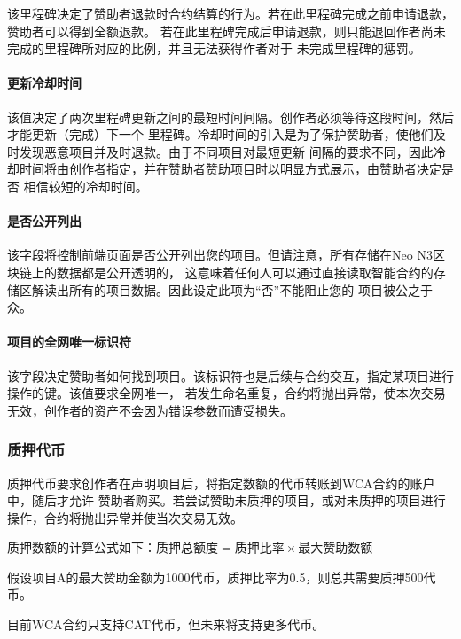 \documentclass[11pt,UTF8,a4paper]{ctexart}
\begin{document}
    该里程碑决定了赞助者退款时合约结算的行为。若在此里程碑完成之前申请退款，赞助者可以得到全额退款。
    若在此里程碑完成后申请退款，则只能退回作者尚未完成的里程碑所对应的比例，并且无法获得作者对于
    未完成里程碑的惩罚。

    \paragraph{更新冷却时间}

    该值决定了两次里程碑更新之间的最短时间间隔。创作者必须等待这段时间，然后才能更新（完成）下一个
    里程碑。冷却时间的引入是为了保护赞助者，使他们及时发现恶意项目并及时退款。由于不同项目对最短更新
    间隔的要求不同，因此冷却时间将由创作者指定，并在赞助者赞助项目时以明显方式展示，由赞助者决定是否
    相信较短的冷却时间。

    \paragraph{是否公开列出}

    该字段将控制前端页面是否公开列出您的项目。但请注意，所有存储在Neo N3区块链上的数据都是公开透明的，
    这意味着任何人可以通过直接读取智能合约的存储区解读出所有的项目数据。因此设定此项为“否”不能阻止您的
    项目被公之于众。

    \paragraph{项目的全网唯一标识符}

    该字段决定赞助者如何找到项目。该标识符也是后续与合约交互，指定某项目进行操作的键。该值要求全网唯一，
    若发生命名重复，合约将抛出异常，使本次交易无效，创作者的资产不会因为错误参数而遭受损失。

    \subsubsection{质押代币}

    质押代币要求创作者在声明项目后，将指定数额的代币转账到WCA合约的账户中，随后才允许
    赞助者购买。若尝试赞助未质押的项目，或对未质押的项目进行操作，合约将抛出异常并使当次交易无效。

    质押数额的计算公式如下：$\text{质押总额度} = \text{质押比率} \times \text{最大赞助数额}$

    假设项目A的最大赞助金额为1000代币，质押比率为0.5，则总共需要质押500代币。

    目前WCA合约只支持CAT代币，但未来将支持更多代币。
\end{document}

